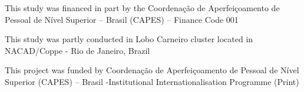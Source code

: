 This study was financed in part by the Coordenação de Aperfeiçoamento de Pessoal de Nível Superior – Brasil (CAPES) – Finance Code 001

This study was partly conducted in Lobo Carneiro cluster located in NACAD/Coppe - Rio de Janeiro, Brazil

This project was funded by Coordenação de Aperfeiçoamento de Pessoal de Nível Superior (CAPES) – Brasil -Institutional Internationalisation Programme  (Print)
